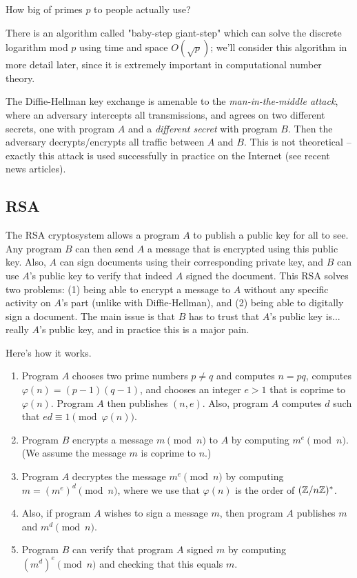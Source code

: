 \documentclass{book}
\begin{document}
\begin{exercise}
How big of primes $p$ to people actually use?
\end{exercise}

There is an algorithm called "baby-step giant-step" which can solve
the discrete logarithm mod $p$ using time and space $O(\sqrt{p})$; we'll
consider this algorithm in more detail later, since it is extremely
important in computational  number theory.


The Diffie-Hellman key exchange is amenable to the {\em man-in-the-middle
attack}, where an adversary intercepts all transmissions, and
agrees on two different secrets, one with program $A$ and a {\em different
secret} with program $B$.  Then the adversary decrypts/encrypts
all traffic between $A$ and $B$.  This is not theoretical -- exactly
this attack is used successfully
in practice on the Internet (see recent news articles).


\subsection{RSA}
The RSA cryptosystem allows a program $A$ to publish a public key
for all to see. Any program $B$ can then send $A$ a message that is encrypted
using this public key.  Also, $A$ can sign documents
using their corresponding private key, and $B$ can use
$A$'s public key to verify that indeed $A$ signed the document.
This RSA solves two problems: (1) being able to encrypt a message to $A$
without any specific activity on $A$'s part (unlike with Diffie-Hellman),
and (2) being able to digitally sign a document.
The main issue is that $B$ has to trust that $A$'s public key is...
really $A$'s public key, and in practice this is a major pain.

Here's how it works.
\begin{enumerate}
\item Program $A$ chooses two prime numbers $p\neq q$
and computes $n=pq$, computes $\varphi(n) = (p-1)(q-1)$,
and chooses an integer $e>1$ that is coprime to $\varphi(n)$.
Program $A$ then publishes $(n, e)$.  Also, program $A$
computes $d$ such that $ed\equiv 1\pmod{\varphi(n)}$.
\item Program $B$ encrypts a message $m\pmod{n}$ to $A$
by computing $m^e\pmod{n}$.  (We assume the message $m$
is coprime to $n$.)
\item Program $A$ decryptes the message $m^e\pmod{n}$
by computing $m=(m^e)^d\pmod{n}$, where we use that
$\varphi(n)$ is the order of $(\mathbb{Z}/n\mathbb{Z})^*$.
\item Also, if program $A$ wishes to sign a message $m$,
then program $A$ publishes $m$ and $m^d\pmod{n}$.
\item Program $B$ can verify that program $A$ signed $m$
by computing $(m^d)^e\pmod{n}$ and checking that this
equals $m$.
\end{enumerate}
\end{document}
